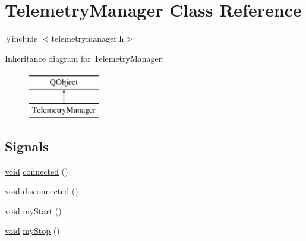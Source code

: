 \hypertarget{class_telemetry_manager}{\section{Telemetry\-Manager Class Reference}
\label{class_telemetry_manager}
}


{\ttfamily \#include $<$telemetrymanager.\-h$>$}

Inheritance diagram for Telemetry\-Manager\-:\begin{figure}[H]
\begin{center}
\leavevmode
\includegraphics[height=2.000000cm]{class_telemetry_manager}
\end{center}
\end{figure}
\subsection*{Signals}
\begin{DoxyCompactItemize}
\item 
\hyperlink{group___u_a_v_objects_plugin_ga444cf2ff3f0ecbe028adce838d373f5c}{void} \hyperlink{group___u_a_v_talk_plugin_ga54bec8ecfe469710c7261f567e76c5f0}{connected} ()
\item 
\hyperlink{group___u_a_v_objects_plugin_ga444cf2ff3f0ecbe028adce838d373f5c}{void} \hyperlink{group___u_a_v_talk_plugin_ga61e671949cc2403327617d9c9a372a76}{disconnected} ()
\item 
\hyperlink{group___u_a_v_objects_plugin_ga444cf2ff3f0ecbe028adce838d373f5c}{void} \hyperlink{group___u_a_v_talk_plugin_gabb52305ac7bcf975fd60517b0dc9a148}{my\-Start} ()
\item 
\hyperlink{group___u_a_v_objects_plugin_ga444cf2ff3f0ecbe028adce838d373f5c}{void} \hyperlink{group___u_a_v_talk_plugin_gabbe5997234dbee93471fcef62361d276}{my\-Stop} ()
\end{DoxyCompactItemize}
